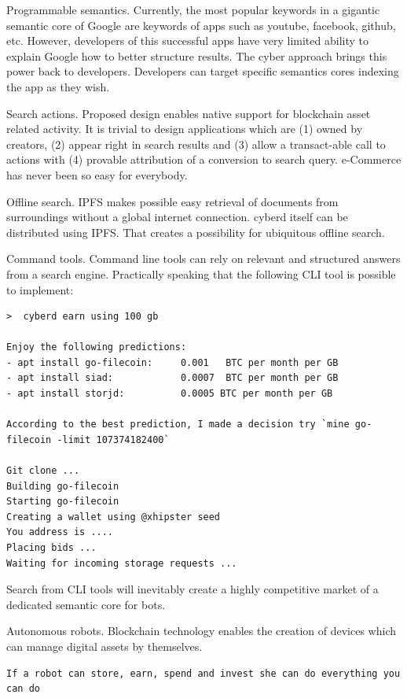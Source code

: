 \documentclass[8pt,oneside]{amsart}
\newcommand{\code}[1]{{\PlayBold #1}}
\begin{document}
\code{Programmable semantics}. Currently, the most popular keywords in a gigantic semantic core of Google are keywords of apps such as youtube, facebook, github, etc. However, developers of this successful apps have very limited ability to explain Google how to better structure results. The cyber approach brings this power back to developers. Developers can target specific semantics cores indexing the app as they wish.

\code{Search actions}. Proposed design enables native support for blockchain asset related activity. It is trivial to design applications which are (1) owned by creators, (2) appear right in search results and (3) allow a transact-able call to actions with (4) provable attribution of a conversion to search query. e-Commerce has never been so easy for everybody.

\code{Offline search}. IPFS makes possible easy retrieval of documents from surroundings without a global internet connection. cyberd itself can be distributed using IPFS. That creates a possibility for ubiquitous offline search.

\code{Command tools}. Command line tools can rely on relevant and structured answers from a search engine. Practically speaking that the following CLI tool is possible to implement:

\begin{lstlisting}
>  cyberd earn using 100 gb

Enjoy the following predictions:
- apt install go-filecoin:     0.001   BTC per month per GB
- apt install siad:            0.0007  BTC per month per GB
- apt install storjd:          0.0005 BTC per month per GB

According to the best prediction, I made a decision try `mine go-filecoin -limit 107374182400`

Git clone ...
Building go-filecoin
Starting go-filecoin
Creating a wallet using @xhipster seed
You address is ....
Placing bids ...
Waiting for incoming storage requests ...

\end{lstlisting}

Search from CLI tools will inevitably create a highly competitive market of a dedicated semantic core for bots.

\code{Autonomous robots}. Blockchain technology enables the creation of devices which can manage digital assets by themselves.

\begin{lstlisting}
If a robot can store, earn, spend and invest she can do everything you can do
\end{lstlisting}
\end{document}
